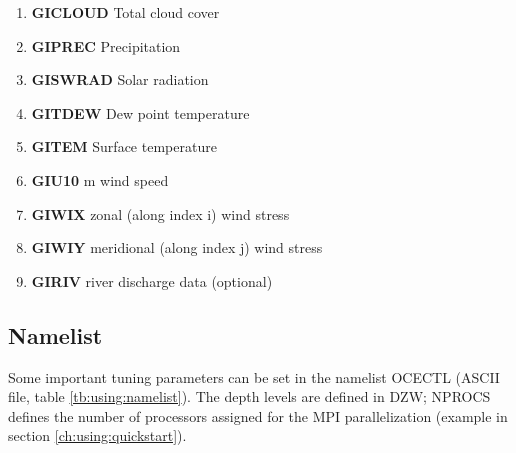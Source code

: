 \begin{enumerate}


\item \textbf{GICLOUD} \newline 
Total cloud cover 
\item \textbf{GIPREC} \newline 
Precipitation 
\item \textbf{GISWRAD} \newline 
Solar radiation 	
\item \textbf{GITDEW} \newline 
Dew point temperature 	 
\item \textbf{GITEM} \newline 
Surface temperature 	 
\item \textbf{GIU10}  m wind speed 	 
\item \textbf{GIWIX} \newline 
zonal (along index i) wind stress 	 
\item \textbf{GIWIY} 
meridional (along index j) wind stress 	 	 
\item \textbf{GIRIV} 
river discharge data (optional)
 
 
\end{enumerate}


\subsection{Namelist}

Some important tuning parameters can be set in the namelist OCECTL (ASCII file, table \ref{tb:using:namelist}).
The depth levels are defined in DZW; NPROCS defines the number of processors 
assigned for the MPI parallelization (example in section \ref{ch:using:quickstart}).


